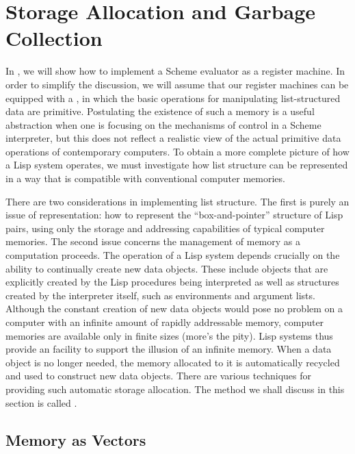 \section{Storage Allocation and Garbage Collection}
\label{Section 5.3}

In , we will show how to implement a Scheme evaluator as a
register machine.  In order to simplify the discussion, we will assume that our
register machines can be equipped with a , in
which the basic operations for manipulating list-structured data are primitive.
Postulating the existence of such a memory is a useful abstraction when one is
focusing on the mechanisms of control in a Scheme interpreter, but this does
not reflect a realistic view of the actual primitive data operations of
contemporary computers.  To obtain a more complete picture of how a Lisp system
operates, we must investigate how list structure can be represented in a way
that is compatible with conventional computer memories.

There are two considerations in implementing list structure.  The first is
purely an issue of representation: how to represent the ``box-and-pointer''
structure of Lisp pairs, using only the storage and addressing capabilities of
typical computer memories.  The second issue concerns the management of memory
as a computation proceeds.  The operation of a Lisp system depends crucially on
the ability to continually create new data objects.  These include objects that
are explicitly created by the Lisp procedures being interpreted as well as
structures created by the interpreter itself, such as environments and argument
lists.  Although the constant creation of new data objects would pose no
problem on a computer with an infinite amount of rapidly addressable memory,
computer memories are available only in finite sizes (more's the pity).  Lisp
systems thus provide an  facility to
support the illusion of an infinite memory.  When a data object is no longer
needed, the memory allocated to it is automatically recycled and used to
construct new data objects.  There are various techniques for providing such
automatic storage allocation.  The method we shall discuss in this section is
called .

\vfill

\subsection{Memory as Vectors}
\label{Section 5.3.1}

